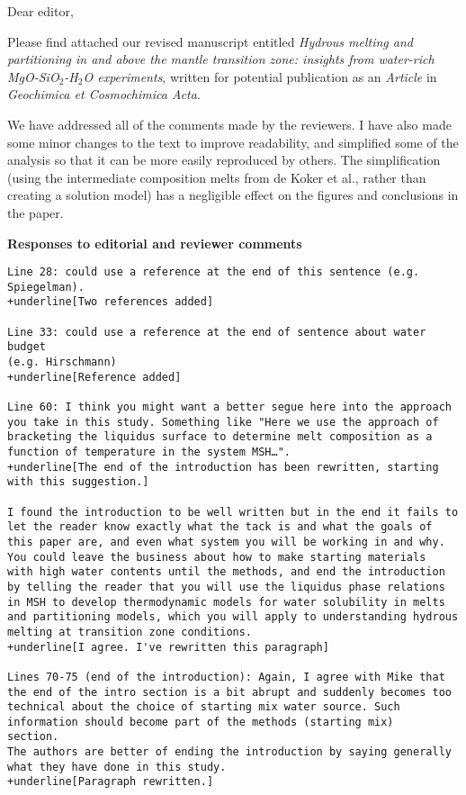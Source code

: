 \documentclass[10pt]{letter}
\date{\today}
\begin{document}
\begin{letter}{}
                           
\opening{Dear editor,}

Please find attached our revised manuscript entitled \emph{Hydrous
  melting and partitioning in and above the mantle transition zone:
  insights from water-rich MgO-SiO$_2$-H$_2$O experiments}, written
for potential publication as an \emph{Article} in \emph{Geochimica et
  Cosmochimica Acta}.

We have addressed all of the comments made by the reviewers. 
I have also made some minor changes to the text to improve
readability, and simplified some of the analysis so that it can be
more easily reproduced by others. The simplification (using the
intermediate composition melts from de Koker et
al., rather than creating a solution model) has a
negligible effect on the figures and conclusions in the paper.


\textbf{Responses to editorial and reviewer comments}
\begin{Verbatim}[commandchars=+\[\]]
Line 28: could use a reference at the end of this sentence (e.g. Spiegelman).
+underline[Two references added]

Line 33: could use a reference at the end of sentence about water
budget 
(e.g. Hirschmann)
+underline[Reference added]

Line 60: I think you might want a better segue here into the approach
you take in this study. Something like "Here we use the approach of 
bracketing the liquidus surface to determine melt composition as a 
function of temperature in the system MSH…".
+underline[The end of the introduction has been rewritten, starting with this suggestion.]

I found the introduction to be well written but in the end it fails to
let the reader know exactly what the tack is and what the goals of
this paper are, and even what system you will be working in and why.  
You could leave the business about how to make starting materials 
with high water contents until the methods, and end the introduction 
by telling the reader that you will use the liquidus phase relations
in MSH to develop thermodynamic models for water solubility in melts 
and partitioning models, which you will apply to understanding hydrous 
melting at transition zone conditions.
+underline[I agree. I've rewritten this paragraph]

Lines 70-75 (end of the introduction): Again, I agree with Mike that
the end of the intro section is a bit abrupt and suddenly becomes too
technical about the choice of starting mix water source. Such
information should become part of the methods (starting mix)
section. 
The authors are better of ending the introduction by saying generally 
what they have done in this study.
+underline[Paragraph rewritten.]


\end{Verbatim}
\end{letter}
\end{document}

